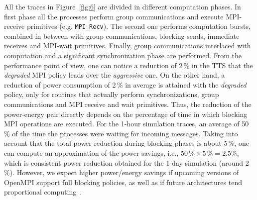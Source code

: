 All  the  traces  in   Figure~\ref{fig:6}  are  divided  in  different
computation  phases. In first  phase all  the processes  perform group
communications      and       execute      MPI-receive      primitives
(e.g. \texttt{MPI\_Recv}). The second one performs computation bursts,
combined  in  between   with  group  communications,  blocking  sends,
immediate  receives and  MPI-wait primitives.  Finally,
group  communications interlaced  with computation  and  a significant
synchronization  phase are  performed. From  the performance  point of
view, one can notice a reduction of 2\,\% in the TTS that the \emph{degraded}  MPI
policy leads over the \emph{aggressive} one. On the other hand, a
reduction of power consumption of  2\,\% in average is attained with the \emph{degraded} 
policy, only for routines that actually  perform synchronizations,
group  communications  and MPI receive and wait primitives.   Thus,  the
reduction of the power-energy  pair directly depends on the percentage
of time in which blocking MPI  operations are executed. For the 1-hour
simulation traces, an average of 50\,\% of the time the processes were
waiting for incoming messages.  Taking  into account that  the total power  reduction during
blocking phases  is about 5\,\%,  one can compute an  approximation of
the  power savings,  i.e., $50\,\%  \times  5\,\% =  2.5\%$, which  is
consistent  power  reduction  obtained  for  the  1-day  simulation
(around  2\,\%). However,  we  expect higher  power/energy savings  if
upcoming versions of OpenMPI support full blocking policies, as well as if 
future architectures tend proportional computing~\citep{Barroso-2007}.



